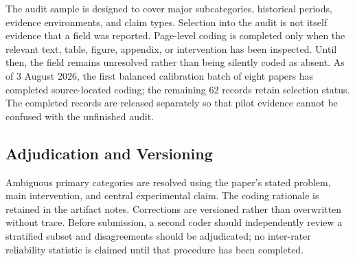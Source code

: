 The audit sample is designed to cover major subcategories, historical periods, evidence environments, and claim types. Selection into the audit is not itself evidence that a field was reported. Page-level coding is completed only when the relevant text, table, figure, appendix, or intervention has been inspected. Until then, the field remains unresolved rather than being silently coded as absent. As of 3 August 2026, the first balanced calibration batch of eight papers has completed source-located coding; the remaining 62 records retain selection status. The completed records are released separately so that pilot evidence cannot be confused with the unfinished audit.

\subsection{Adjudication and Versioning}
Ambiguous primary categories are resolved using the paper's stated problem, main intervention, and central experimental claim. The coding rationale is retained in the artifact notes. Corrections are versioned rather than overwritten without trace. Before submission, a second coder should independently review a stratified subset and disagreements should be adjudicated; no inter-rater reliability statistic is claimed until that procedure has been completed.
